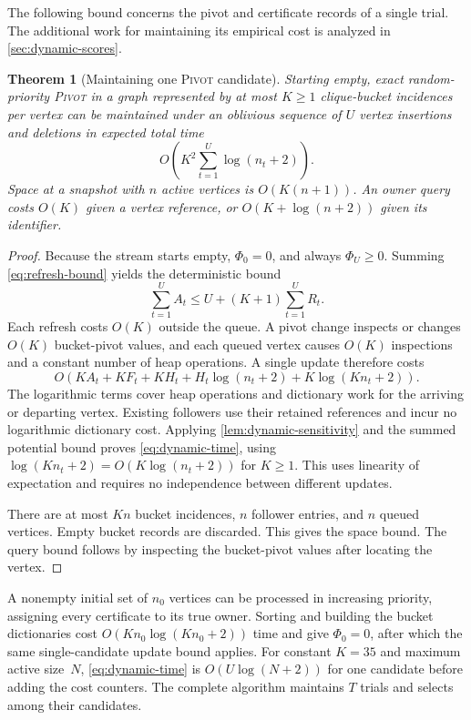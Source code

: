 \documentclass[11pt,letterpaper]{article}
\newtheorem{theorem}{Theorem}[section]
\theoremstyle{definition}
\theoremstyle{remark}
\newcommand{\1}{\mathbf{1}}
\newcommand{\Pivot}{\textnormal{\textsc{Pivot}}}
\begin{document}
The following bound concerns the pivot and certificate records of a single trial.  The additional work for maintaining its empirical cost is analyzed in \cref{sec:dynamic-scores}.

\begin{theorem}[Maintaining one \Pivot{} candidate]\label{thm:dynamic-pivot}
Starting empty, exact random-priority \Pivot{} in a graph represented by at most $K\ge1$ clique-bucket incidences per vertex can be maintained under an oblivious sequence of $U$ vertex insertions and deletions in expected total time
\begin{equation}\label{eq:dynamic-time}
 O\!\left(K^2\sum_{t=1}^U\log(n_t+2)\right).
\end{equation}
Space at a snapshot with $n$ active vertices is $O(K(n+1))$.  An owner query costs $O(K)$ given a vertex reference, or $O(K+\log(n+2))$ given its identifier.
\end{theorem}

\begin{proof}
Because the stream starts empty, $\Phi_0=0$, and always $\Phi_U\ge0$.  Summing \cref{eq:refresh-bound} yields the deterministic bound
\[
 \sum_{t=1}^U A_t\le U+(K+1)\sum_{t=1}^U R_t.
\]
Each refresh costs $O(K)$ outside the queue.  A pivot change inspects or changes $O(K)$ bucket-pivot values, and each queued vertex causes $O(K)$ inspections and a constant number of heap operations.  A single update therefore costs
\[
 O\!\left(KA_t+KF_t+KH_t+H_t\log(n_t+2)+K\log(Kn_t+2)\right).
\]
The logarithmic terms cover heap operations and dictionary work for the arriving or departing vertex.  Existing followers use their retained references and incur no logarithmic dictionary cost.  Applying \cref{lem:dynamic-sensitivity} and the summed potential bound proves \cref{eq:dynamic-time}, using $\log(Kn_t+2)=O(K\log(n_t+2))$ for $K\ge1$.  This uses linearity of expectation and requires no independence between different updates.

There are at most $Kn$ bucket incidences, $n$ follower entries, and $n$ queued vertices.  Empty bucket records are discarded.  This gives the space bound.  The query bound follows by inspecting the bucket-pivot values after locating the vertex.
\end{proof}

A nonempty initial set of $n_0$ vertices can be processed in increasing priority, assigning every certificate to its true owner.  Sorting and building the bucket dictionaries cost $O(Kn_0\log(Kn_0+2))$ time and give $\Phi_0=0$, after which the same single-candidate update bound applies.  For constant $K=35$ and maximum active size~$N$, \cref{eq:dynamic-time} is $O(U\log(N+2))$ for one candidate before adding the cost counters.  The complete algorithm maintains $T$ trials and selects among their candidates.
\end{document}
